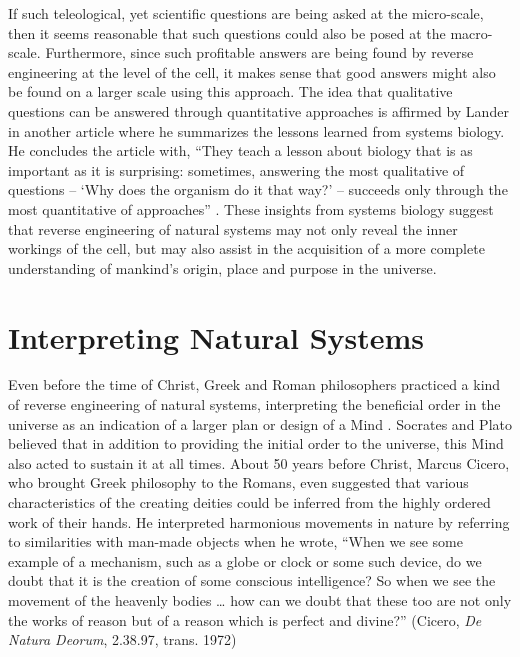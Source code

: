 If such teleological, yet scientific questions are being asked at the
micro-scale, then it seems reasonable that such questions could also be
posed at the macro-scale. Furthermore, since such profitable answers
are being found by reverse engineering at the level of the cell, it
makes sense that good answers might also be found on a larger scale
using this approach. The idea that qualitative questions can be
answered through quantitative approaches is affirmed by Lander in
another article where he summarizes the lessons learned from systems
biology. He concludes the article with, ``They teach a lesson about
biology that is as important as it is surprising: sometimes, answering
the most qualitative of questions – `Why does the organism do it that
way?' – succeeds only through the most quantitative of
approaches'' \citep{lander2007}. These insights from systems biology
suggest that reverse engineering of natural systems may not only reveal
the inner workings of the cell, but may also assist in the acquisition
of a more complete understanding of mankind’s origin, place and purpose
in the universe.

\section{Interpreting Natural Systems}

Even before the time of Christ, Greek and Roman philosophers practiced a
kind of reverse engineering of natural systems, interpreting the
beneficial order in the universe as an indication of a larger plan or
design of a Mind \citep{sedley2009}. Socrates and Plato believed that
in addition to providing the initial order to the universe, this Mind
also acted to sustain it at all times. About 50 years before Christ,
Marcus Cicero, who brought Greek philosophy to the Romans, even
suggested that various characteristics of the creating deities could be
inferred from the highly ordered work of their hands. He interpreted
harmonious movements in nature by referring to similarities with
man-made objects when he wrote, “When we see some example of a
mechanism, such as a globe or clock or some such device, do we doubt
that it is the creation of some conscious intelligence? So when we see
the movement of the heavenly bodies {\ldots} how can we doubt that these too are
not only the works of reason but of a reason which is perfect and
divine?” (Cicero, \textit{De Natura Deorum}, 2.38.97, trans. 1972) %


